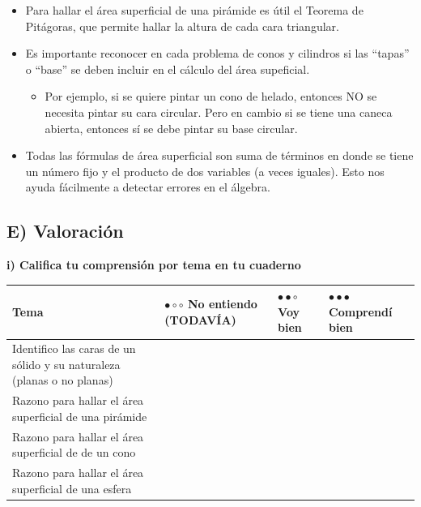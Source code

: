 \documentclass[12pt,a4paper]{article}
\begin{document}
\begin{tcolorbox}[colback=fondoverde, colframe=verdeclaro, title=\textbf{Ten en cuenta que:}, breakable]
\begin{itemize}[nosep]
    \item Para hallar el área superficial de una pirámide es útil el Teorema de Pitágoras, que permite hallar la altura de cada cara triangular.
    \item Es importante reconocer en cada problema de conos y cilindros si las ``tapas'' o ``base'' se deben incluir en el cálculo del área supeficial.
    \begin{itemize}[nosep]
        \item Por ejemplo, si se quiere pintar un cono de helado, entonces NO se necesita pintar su cara circular. Pero en cambio si se tiene una caneca abierta, entonces sí se debe pintar su base circular.
    \end{itemize}
    \item Todas las fórmulas de área superficial son suma de términos en donde se tiene un número fijo y el producto de dos variables (a veces iguales). Esto nos ayuda fácilmente a detectar errores en el álgebra.
\end{itemize}
\end{tcolorbox}

\vspace{4mm}


\subsection*{E) Valoración}

\textbf{i) Califica tu comprensión por tema en tu cuaderno}

\begin{center}
\small
\begin{tabular}{|
		>{\centering\arraybackslash}m{5.5cm}|
		>{\centering\arraybackslash}m{2.5cm}|
		>{\centering\arraybackslash}m{2.5cm}|
		>{\centering\arraybackslash}m{2.5cm}|}
\hline
\textbf{Tema} & \textbf{$\bullet\circ\circ$ No entiendo (TODAVÍA)} & \textbf{$\bullet\bullet\circ$ Voy bien} & \textbf{$\bullet\bullet\bullet$ Comprendí bien} \\
\hline
Identifico las caras de un sólido y su naturaleza (planas o no planas) & & & \\
\hline
Razono para hallar el área superficial de una pirámide & & & \\
\hline
Razono para hallar el área superficial de de un cono & & & \\
\hline
Razono para hallar el área superficial de una esfera & & & \\
\hline
\end{tabular}
\end{center}
\end{document}
